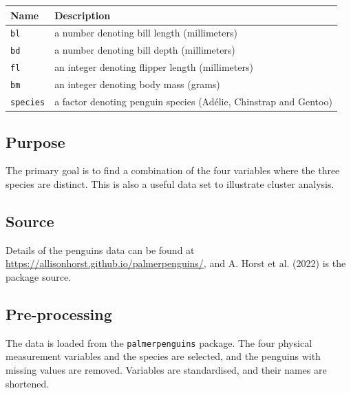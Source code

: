 \documentclass[
  letterpaper,
]{krantz}
\begin{document}
\begin{longtable}[]{@{}
  >{\raggedright\arraybackslash}p{}
  >{\raggedright\arraybackslash}p{}@{}}
\toprule\noalign{}
\begin{minipage}[b]{\linewidth}\raggedright
Name
\end{minipage} & \begin{minipage}[b]{\linewidth}\raggedright
Description
\end{minipage} \\
\midrule\noalign{}
\endhead
\bottomrule\noalign{}
\endlastfoot
\texttt{bl} & a number denoting bill length (millimeters) \\
\texttt{bd} & a number denoting bill depth (millimeters) \\
\texttt{fl} & an integer denoting flipper length (millimeters) \\
\texttt{bm} & an integer denoting body mass (grams) \\
\texttt{species} & a factor denoting penguin species (Adélie, Chinstrap
and Gentoo) \\
\end{longtable}

\subsection*{Purpose}\label{purpose-3}

The primary goal is to find a combination of the four variables where
the three species are distinct. This is also a useful data set to
illustrate cluster analysis.

\subsection*{Source}\label{source-3}

Details of the penguins data can be found at
\url{https://allisonhorst.github.io/palmerpenguins/}, and A. Horst et
al. (2022) is the package source.

\subsection*{Pre-processing}\label{pre-processing-3}

The data is loaded from the \texttt{palmerpenguins} package. The four
physical measurement variables and the species are selected, and the
penguins with missing values are removed. Variables are standardised,
and their names are shortened.
\end{document}
